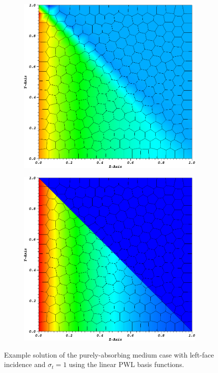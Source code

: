 \begin{figure}
{\begin{subfigure}[b]{0.485\textwidth}
	\end{subfigure}
}
\vspace{1cm}
{
	\begin{subfigure}[b]{0.485\textwidth}
		\centering
		\label{subfig::PA_Mesh_Poly}
		\includegraphics[width=\textwidth]{figures/sec_BF/PALeftSol_Poly.png}
	\end{subfigure}
	\hfill
	\begin{subfigure}[b]{0.485\textwidth}
		\centering
		\label{subfig::PA_Mesh_SplitPoly}
		\includegraphics[width=\textwidth]{figures/sec_BF/PALeftSol_SplitPoly.png}
	\end{subfigure}
}
\caption{Example solution of the purely-absorbing medium case with left-face incidence and $\sigma_t=1$ using the linear PWL basis functions.}
\label{fig::BF_Results_PA_Left_Solutions}
\end{figure}

